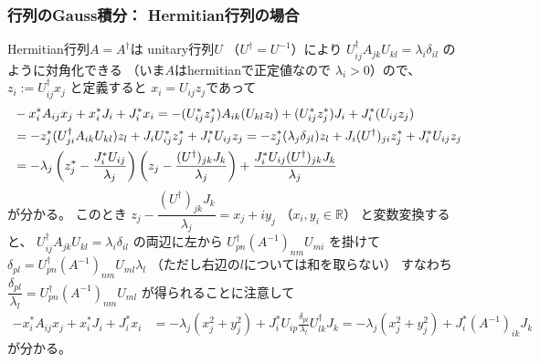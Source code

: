 
\subsubsection{行列のGauss積分：
    Hermitian行列の場合}

Hermitian行列$A = A^\dagger$は
unitary行列$U$
（$U^\dagger = U^{-1}$）により
$U^\dagger_{ij} A_{jk} U_{kl}
= \lambda_i \delta_{il}$
のように対角化できる
（いま$A$はhermitianで正定値なので
$\lambda_i > 0$）ので、
$z_i := U_{ij}^\dagger x_j$
と定義すると
$x_i = U_{ij} z_j$であって
\begin{align}
    &
    - x^*_i A_{ij} x_j
    + x^*_i J_i
    + J^*_i x_i
=
    - (U^*_{ij} z^*_j)
    A_{ik}
    (U_{kl} z_l)
    + (U^*_{ij} z^*_j)
    J_i
    + J^*_i
    (U _{ij} z_j)
\notag\\&=
    - z^*_j
    (U^\dagger_{ji} A_{ik} U_{kl})
    z_l
    + J_i U^*_{ij} z^*_j
    + J^*_i U_{ij} z_j
=
    - z^*_j
    (\lambda_j \delta_{jl})
    z_l
    + J_i (U^\dagger)_{ji} z^*_j
    + J^*_i U_{ij} z_j
\notag\\&
=
    - \lambda_j
    \left(
        z^*_j
        - \frac{ J^*_i U _{ij} }{\lambda_j}
    \right)
    \left(
        z_j
        - \frac{ (U^\dagger)_{jk} J_k }{\lambda_j}
    \right)
    + \frac{
        J^*_i U _{ij}
        (U^\dagger)_{jk} J_k
    }{\lambda_j}
\end{align}
が分かる。
このとき
$z_j
    -
    \dfrac{ (U^\dagger)_{jk} J_k }{\lambda_j}
= x_j + i y_j$
（$x_i, y_i \in \mathbb{R}$）
と変数変換すると、
$U^\dagger_{ij} A_{jk} U_{kl} 
= \lambda_i \delta_{il}$
の両辺に左から
$U^\dagger_{pn} (A^{-1})_{nm} U_{mi}$
を掛けて
$\delta_{pl}
= U^\dagger_{pn} (A^{-1})_{nm} U_{ml} \lambda_l$
（ただし右辺の$l$については和を取らない）
すなわち
$\dfrac{\delta_{pl}}{\lambda_l}
= U^\dagger_{pn} (A^{-1})_{nm} U_{ml}$
が得られることに注意して
\begin{align}
    - x^*_i A_{ij} x_j
    + x^*_i J_i
    + J^*_i x_i
&=
    - \lambda_j
    \left( x^2_j + y_j^2 \right)
    + J^*_i U _{ip}
    \frac{ \delta_{pl} }{\lambda_l}
    U^\dagger_{lk} J_k
=
    - \lambda_j
    \left( x^2_j + y_j^2 \right)
    + J^*_i (A^{-1})_{ik} J_k
\end{align}
が分かる。


